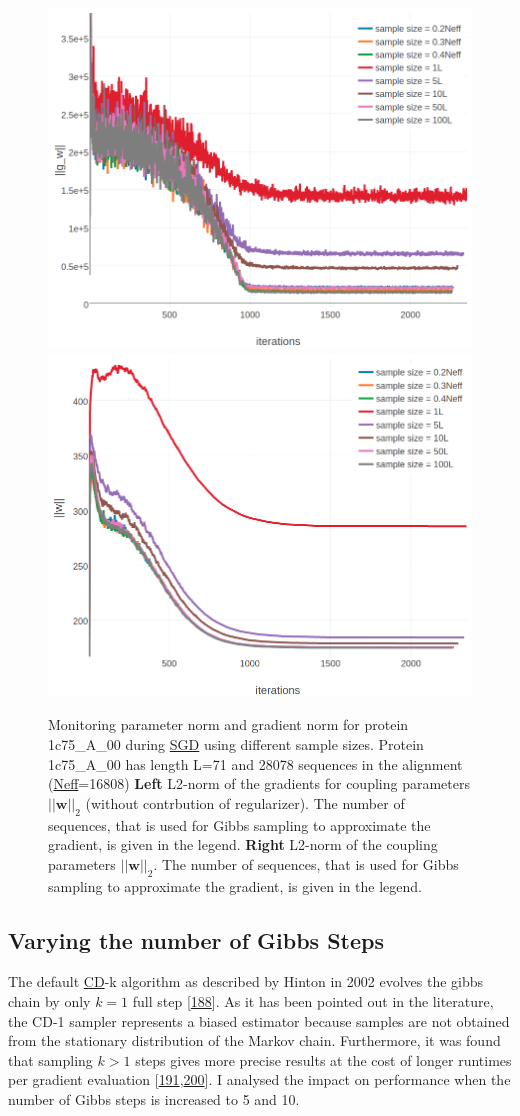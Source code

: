 \documentclass[11pt,a4paper,twoside]{book}
\newcommand{\eq}{\!=\!}
\newcommand{\w}{\mathbf{w}}
\theoremstyle{definition}
\theoremstyle{definition}
\theoremstyle{remark}
\begin{document}
\begin{figure}

{\centering \includegraphics[width=0.48\linewidth]{img/full_likelihood/gibbs_sampling/1c75A00_gradient_norm_for_samplesizes} \includegraphics[width=0.48\linewidth]{img/full_likelihood/gibbs_sampling/1c75A00_parameter_norm_for_samplesizes} 

}

\caption{Monitoring parameter norm and
gradient norm for protein 1c75\_A\_00 during
\protect\hyperlink{abbrev}{SGD} using different sample sizes. Protein
1c75\_A\_00 has length L=71 and 28078 sequences in the alignment
(\protect\hyperlink{abbrev}{Neff}=16808) \textbf{Left} L2-norm of the
gradients for coupling parameters \(||\w||_2\) (without contrbution of
regularizer). The number of sequences, that is used for Gibbs sampling
to approximate the gradient, is given in the legend. \textbf{Right}
L2-norm of the coupling parameters \(||\w||_2\). The number of
sequences, that is used for Gibbs sampling to approximate the gradient,
is given in the legend.}\label{fig:cd-samplesize-protein1c75a00}
\end{figure}

\subsection{Varying the number of Gibbs Steps}\label{cd-gibbs-steps}

The default \protect\hyperlink{abbrev}{CD}-k algorithm as described by
Hinton in 2002 evolves the gibbs chain by only \(k \eq 1\) full step
{[}\protect\hyperlink{ref-Hinton2002}{188}{]}. As it has been pointed
out in the literature, the CD-1 sampler represents a biased estimator
because samples are not obtained from the stationary distribution of the
Markov chain. Furthermore, it was found that sampling \(k>1\) steps
gives more precise results at the cost of longer runtimes per gradient
evaluation
{[}\protect\hyperlink{ref-Bengio2009}{191},\protect\hyperlink{ref-Tieleman2008}{200}{]}.
I analysed the impact on performance when the number of Gibbs steps is
increased to 5 and 10.
\end{document}
